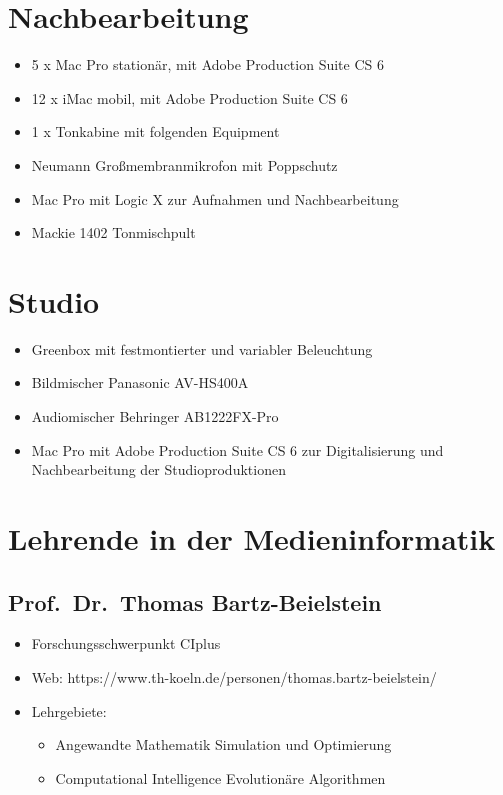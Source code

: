 \section{Nachbearbeitung}\label{nachbearbeitung}

\begin{itemize}
\item
  5 x Mac Pro stationär, mit Adobe Production Suite CS 6
\item
  12 x iMac mobil, mit Adobe Production Suite CS 6
\item
  1 x Tonkabine mit folgenden Equipment
\item
  Neumann Großmembranmikrofon mit Poppschutz
\item
  Mac Pro mit Logic X zur Aufnahmen und Nachbearbeitung
\item
  Mackie 1402 Tonmischpult
\end{itemize}

\section{Studio}\label{studio}

\begin{itemize}
\tightlist
\item
  Greenbox mit festmontierter und variabler Beleuchtung
\item
  Bildmischer Panasonic AV-HS400A
\item
  Audiomischer Behringer AB1222FX-Pro
\item
  Mac Pro mit Adobe Production Suite CS 6 zur Digitalisierung und
  Nachbearbeitung der Studioproduktionen
\end{itemize}

\section{Lehrende in der
Medieninformatik}\label{lehrende-in-der-medieninformatik}

\subsection{Prof.~Dr.~Thomas
Bartz-Beielstein}\label{prof.dr.thomas-bartz-beielstein}

\begin{itemize}
\tightlist
\item
  Forschungsschwerpunkt CIplus
\item
  Web: https://www.th-koeln.de/personen/thomas.bartz-beielstein/
\item
  Lehrgebiete:

  \begin{itemize}
  \tightlist
  \item
    Angewandte Mathematik Simulation und Optimierung~
  \item
    Computational Intelligence Evolutionäre Algorithmen
  \end{itemize}
\end{itemize}

